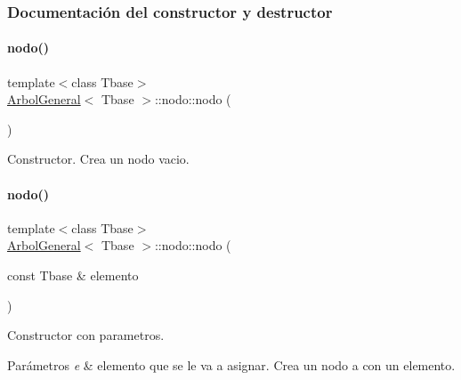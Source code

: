 \subsubsection{Documentación del constructor y destructor}
\hypertarget{structArbolGeneral_1_1nodo_aa217b530d586a4f7908df98083c697ff}{}\label{structArbolGeneral_1_1nodo_aa217b530d586a4f7908df98083c697ff} 
\paragraph{\texorpdfstring{nodo()}{nodo()}\hspace{0.1cm}{\footnotesize\ttfamily [1/2]}}
{\footnotesize\ttfamily template$<$class Tbase$>$ \\
\hyperlink{classArbolGeneral}{Arbol\+General}$<$ Tbase $>$\+::nodo\+::nodo (\begin{DoxyParamCaption}{ }\end{DoxyParamCaption})\hspace{0.3cm}{\ttfamily [inline]}}



Constructor. Crea un nodo vacio. 

\hypertarget{structArbolGeneral_1_1nodo_a858436a6f4cf67e88dcea51708871de9}{}\label{structArbolGeneral_1_1nodo_a858436a6f4cf67e88dcea51708871de9} 
\paragraph{\texorpdfstring{nodo()}{nodo()}\hspace{0.1cm}{\footnotesize\ttfamily [2/2]}}
{\footnotesize\ttfamily template$<$class Tbase$>$ \\
\hyperlink{classArbolGeneral}{Arbol\+General}$<$ Tbase $>$\+::nodo\+::nodo (\begin{DoxyParamCaption}\item[{const Tbase \&}]{elemento }\end{DoxyParamCaption})\hspace{0.3cm}{\ttfamily [inline]}}



Constructor con parametros. 


\begin{DoxyParams}{Parámetros}
{\em e} & elemento que se le va a asignar. Crea un nodo a con un elemento. \\
\hline
\end{DoxyParams}
\hypertarget{structArbolGeneral_1_1nodo_a70407725ad94243a38097cd7477a7f10}{}\label{structArbolGeneral_1_1nodo_a70407725ad94243a38097cd7477a7f10} 
